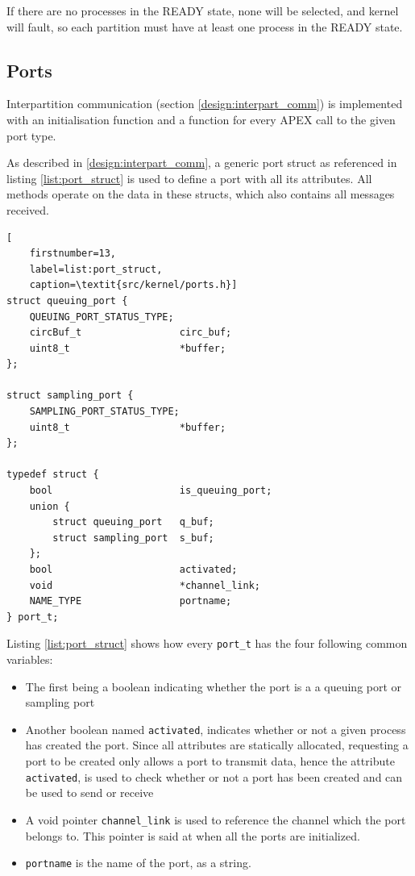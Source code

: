 If there are no processes in the READY state, none will be selected, and kernel
will fault, so each partition must have at least one process in the READY state.


\subsection{Ports}
\label{impl:ports}
Interpartition communication (section \ref{design:interpart_comm})
is implemented with an initialisation function and a function for every APEX call to the given port type.

As described in \ref{design:interpart_comm},
a generic port struct as referenced in listing \ref{list:port_struct} is used to define a port with all its attributes.
All methods operate on the data in these structs,
which also contains all messages received.

\begin{minipage}{\linewidth}
\begin{lstlisting}[
	firstnumber=13,
	label=list:port_struct,
	caption=\textit{src/kernel/ports.h}]
struct queuing_port {
    QUEUING_PORT_STATUS_TYPE;
    circBuf_t                 circ_buf;
    uint8_t                   *buffer;
};

struct sampling_port {
    SAMPLING_PORT_STATUS_TYPE;
    uint8_t                   *buffer;
};

typedef struct {
    bool                      is_queuing_port;
    union {
        struct queuing_port   q_buf;
        struct sampling_port  s_buf;
    };
    bool                      activated;
    void                      *channel_link;
    NAME_TYPE                 portname;
} port_t;
\end{lstlisting}
\end{minipage}

Listing \ref{list:port_struct} shows how every \texttt{port\_t} has the four following common variables:

\begin{itemize}
	\item The first being a boolean indicating whether the port is a a queuing port or sampling port
	\item Another boolean named \texttt{activated}, indicates whether or not a given process has created the port.
		Since all attributes are statically allocated, requesting a port to be created only allows a port to transmit data,
		hence the attribute \texttt{activated}, is used to check whether or not a port has been created and can be used to send or receive
	\item A void pointer \texttt{channel\_link} is used to reference the channel which the port belongs to.
		This pointer is said at when all the ports are initialized.
	\item \texttt{portname} is the name of the port, as a string.
\end{itemize}

